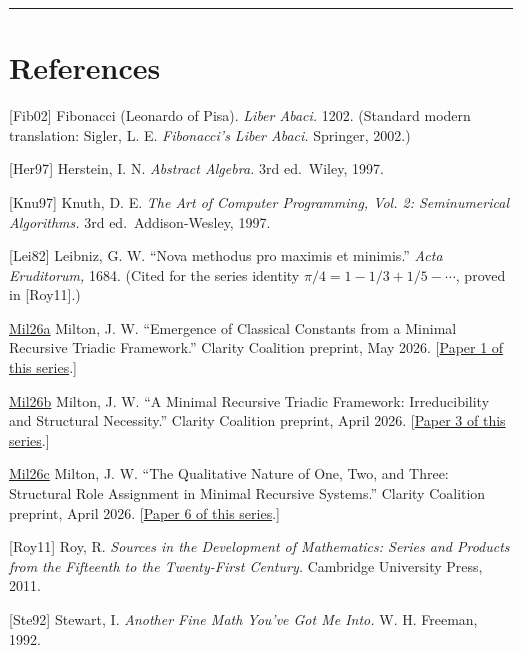 \documentclass[12pt]{article}
\begin{document}
\begin{center}\rule{0.5\linewidth}{0.5pt}\end{center}

\section{References}\label{references}

{[}Fib02{]} Fibonacci (Leonardo of Pisa). \emph{Liber Abaci.} 1202.
(Standard modern translation: Sigler, L. E. \emph{Fibonacci's Liber
Abaci.} Springer, 2002.)

{[}Her97{]} Herstein, I. N. \emph{Abstract Algebra.} 3rd ed.~Wiley,
1997.

{[}Knu97{]} Knuth, D. E. \emph{The Art of Computer Programming, Vol. 2:
Seminumerical Algorithms.} 3rd ed.~Addison-Wesley, 1997.

{[}Lei82{]} Leibniz, G. W. ``Nova methodus pro maximis et minimis.''
\emph{Acta Eruditorum,} 1684. (Cited for the series identity
\(\pi/4 = 1 - 1/3 + 1/5 - \cdots\), proved in {[}Roy11{]}.)

\href{https://github.com/baardev/truevalue/blob/main/docnav/Research/papers/1_recursive-tholonic-five-constants/1_recursive-tholonic-five-constants.pdf}{Mil26a}
Milton, J. W. ``Emergence of Classical Constants from a Minimal
Recursive Triadic Framework.'' Clarity Coalition preprint, May 2026.
{[}\href{https://github.com/baardev/truevalue/blob/main/docnav/Research/papers/1_recursive-tholonic-five-constants/1_recursive-tholonic-five-constants.pdf}{Paper
1 of this series}.{]}

\href{https://github.com/baardev/truevalue/blob/main/docnav/Research/papers/3_minimal-recursive-triadic-framework/3_minimal-recursive-triadic-framework.pdf}{Mil26b}
Milton, J. W. ``A Minimal Recursive Triadic Framework: Irreducibility
and Structural Necessity.'' Clarity Coalition preprint, April 2026.
{[}\href{https://github.com/baardev/truevalue/blob/main/docnav/Research/papers/3_minimal-recursive-triadic-framework/3_minimal-recursive-triadic-framework.pdf}{Paper
3 of this series}.{]}

\href{https://github.com/baardev/truevalue/blob/main/docnav/Research/papers/6_qualitative-nature-integers-triadic-roles/6_qualitative-nature-integers-triadic-roles.pdf}{Mil26c}
Milton, J. W. ``The Qualitative Nature of One, Two, and Three:
Structural Role Assignment in Minimal Recursive Systems.'' Clarity
Coalition preprint, April 2026.
{[}\href{https://github.com/baardev/truevalue/blob/main/docnav/Research/papers/6_qualitative-nature-integers-triadic-roles/6_qualitative-nature-integers-triadic-roles.pdf}{Paper
6 of this series}.{]}

{[}Roy11{]} Roy, R. \emph{Sources in the Development of Mathematics:
Series and Products from the Fifteenth to the Twenty-First Century.}
Cambridge University Press, 2011.

{[}Ste92{]} Stewart, I. \emph{Another Fine Math You've Got Me Into.} W.
H. Freeman, 1992.
\end{document}
